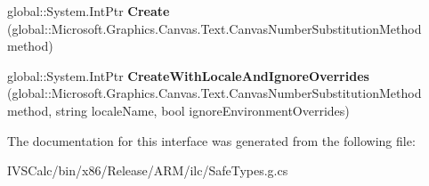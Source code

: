 \begin{DoxyCompactItemize}
global\+::\+System.\+Int\+Ptr {\bfseries Create} (global\+::\+Microsoft.\+Graphics.\+Canvas.\+Text.\+Canvas\+Number\+Substitution\+Method method)
\item 
\mbox{\label{interface_microsoft_1_1_graphics_1_1_canvas_1_1_text_1_1_i_canvas_number_substitution_factory_a02cc93fd08d82ad029a3ad58cd6c1a9e}} 
global\+::\+System.\+Int\+Ptr {\bfseries Create\+With\+Locale\+And\+Ignore\+Overrides} (global\+::\+Microsoft.\+Graphics.\+Canvas.\+Text.\+Canvas\+Number\+Substitution\+Method method, string locale\+Name, bool ignore\+Environment\+Overrides)
\end{DoxyCompactItemize}


The documentation for this interface was generated from the following file\+:\begin{DoxyCompactItemize}
\item 
I\+V\+S\+Calc/bin/x86/\+Release/\+A\+R\+M/ilc/Safe\+Types.\+g.\+cs\end{DoxyCompactItemize}
